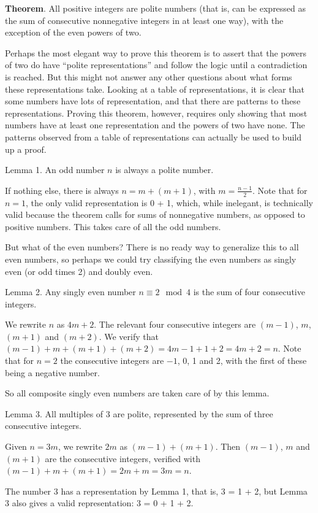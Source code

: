\documentclass[12pt]{article}
\begin{document}
{\bf Theorem}. All positive integers are polite numbers (that is, can be expressed as the sum of consecutive nonnegative integers in at least one way), with the exception of the even powers of two.

Perhaps the most elegant way to prove this theorem is to assert that the powers of two do have ``polite representations'' and follow the logic until a contradiction is reached. But this might not answer any other questions about what forms these representations take. Looking at a table of representations, it is clear that some numbers have lots of representation, and that there are patterns to these representations. Proving this theorem, however, requires only showing that most numbers have at least one representation and the powers of two have none. The patterns observed from a table of representations can actually be used to build up a proof.

Lemma 1. An odd number $n$ is always a polite number.

If nothing else, there is always $n = m + (m + 1)$, with $m = \frac{n - 1}{2}$. Note that for $n = 1$, the only valid representation is 0 + 1, which, while inelegant, is technically valid because the theorem calls for sums of nonnegative numbers, as opposed to positive numbers. This takes care of all the odd numbers.

But what of the even numbers? There is no ready way to generalize this to all even numbers, so perhaps we could try classifying the even numbers as singly even (or odd times 2) and doubly even.

Lemma 2. Any singly even number $n \equiv 2 \mod 4$ is the sum of four consecutive integers.

We rewrite $n$ as $4m + 2$. The relevant four consecutive integers are $(m - 1)$, $m$, $(m + 1)$ and $(m + 2)$. We verify that $(m - 1) + m + (m + 1) + (m + 2) = 4m - 1 + 1 + 2 = 4m + 2 = n$. Note that for $n = 2$ the consecutive integers are $-1$, 0, 1 and 2, with the first of these being a negative number.

So all composite singly even numbers are taken care of by this lemma.

Lemma 3. All multiples of 3 are polite, represented by the sum of three consecutive integers.

Given $n = 3m$, we rewrite $2m$ as $(m - 1) + (m + 1)$. Then $(m - 1)$, $m$ and $(m + 1)$ are the consecutive integers, verified with $(m - 1) + m + (m + 1) = 2m + m = 3m = n$.

The number 3 has a representation by Lemma 1, that is, 3 = 1 + 2, but Lemma 3 also gives a valid representation: 3 = 0 + 1 + 2.
\end{document}
